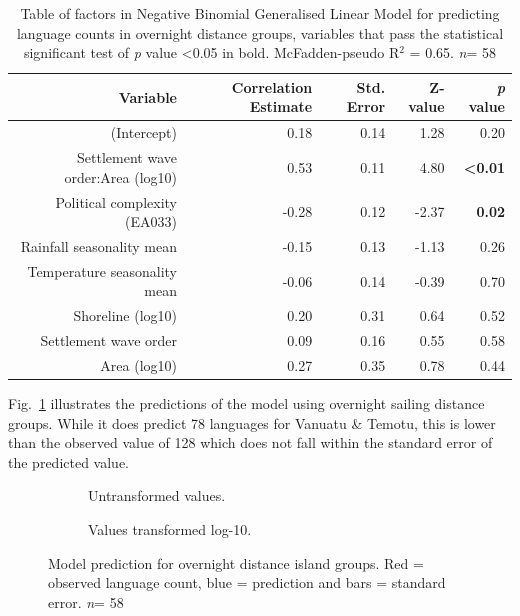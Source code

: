 \documentclass[a4paper,10pt]{article} %
\begin{document}
\begin{table}%
\centering
\begin{tabular}{rrrrr}
  \hline
Variable & Correlation Estimate & Std. Error & Z-value & \emph{p} value \\ 
  \hline
(Intercept) & 0.18 & 0.14 & 1.28 & 0.20 \\ 
Settlement wave order:Area (log10) & 0.53 & 0.11 & 4.80 &   \textbf{<0.01} \\   
Political complexity (EA033) & -0.28 & 0.12 & -2.37 & \textbf{0.02} \\ 
Rainfall seasonality mean & -0.15 & 0.13 & -1.13 & 0.26 \\ 
Temperature seasonality mean & -0.06 & 0.14 & -0.39 & 0.70 \\ 
Shoreline (log10) & 0.20 & 0.31 & 0.64 & 0.52 \\ 
Settlement wave order & 0.09 & 0.16 & 0.55 & 0.58 \\ 
Area (log10)& 0.27 & 0.35 & 0.78 & 0.44 \\ 
 \hline
\end{tabular}
\caption[Table of factors in Negative Binomial Generalised Linear Model for predicting language counts in overnight distance groups.]{Table of factors in Negative Binomial Generalised Linear Model for predicting language counts in overnight distance groups, variables that pass the statistical significant test of \emph{p} value <0.05 in bold. McFadden-pseudo R$^2$ = 0.65.  \emph{n}= 58} 
\label{table:GLM_model_marck}
\end{table}

Fig.~\ref{Marck_model_predict_table} illustrates the predictions of the model using overnight sailing distance groups. While it does predict 78 languages for Vanuatu \& Temotu, this is lower than the observed value of 128 which does not fall within the standard error of the predicted value.

    \begin{figure}
\centering
    \begin{subfigure}{12cm}
\centering
\caption{Untransformed values.}
    \end{subfigure}
\hfil
    \begin{subfigure}{12cm}
\centering
\caption{Values transformed log-10.}
    \end{subfigure}
\caption[Model prediction for overnight distance island groups.]{{Model prediction for overnight distance island groups. Red = observed language count, blue = prediction and bars = standard error. \emph{n}= 58}}
\label{Marck_model_predict_table}
\end{figure}
\end{document}
